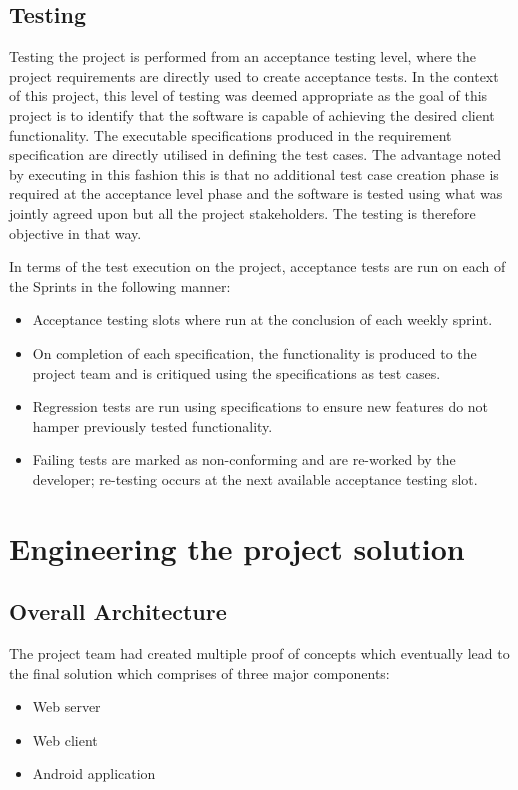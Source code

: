 \documentclass[12pt]{witseiepaper}
\begin{document}
\subsection{Testing}
Testing the project is performed from an acceptance testing level, where the project requirements are directly used to create acceptance tests. \cite{AcceptanceTest} In the context of this project, this level of testing was deemed appropriate as the goal of this project is to identify that the software is capable of achieving the desired client functionality.
The executable specifications produced in the requirement specification are directly utilised in defining the test cases. The advantage noted by executing in this fashion this is that no additional test case creation phase is required at the acceptance level phase and the software is tested using what was jointly agreed upon but all the project stakeholders. The testing is therefore objective in that way.

In terms of the test execution on the project, acceptance tests are run on each of the Sprints in the following manner:



\begin{itemize}
	\item Acceptance testing slots where run at the conclusion of each weekly sprint.
	\item On completion of each specification, the functionality is produced to the project team and is critiqued using the specifications as test cases.
	\item Regression tests are run using specifications to ensure new features do not hamper previously tested functionality.
	\item Failing tests are marked as non-conforming and are re-worked by the developer; re-testing occurs at the next available acceptance testing slot. 
\end{itemize}




\section{Engineering the project solution}




\subsection{Overall Architecture}
The project team had created multiple proof of concepts which eventually lead to the final solution which comprises of three major components:
\begin{itemize}
\item Web server 
\item Web client
\item Android application
\end{itemize}
\end{document}
